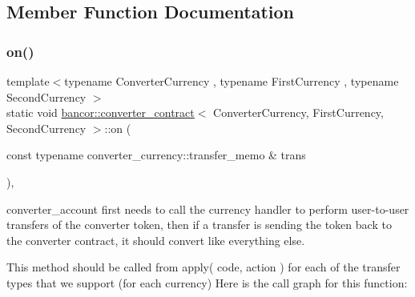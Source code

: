 \subsection{Member Function Documentation}
\mbox{\label{classbancor_1_1converter__contract_a9042eadac31dfc5a4133cfbecaefb66e}} 
\subsubsection{\texorpdfstring{on()}{on()}\hspace{0.1cm}{\footnotesize\ttfamily [1/2]}}
{\footnotesize\ttfamily template$<$typename Converter\+Currency , typename First\+Currency , typename Second\+Currency $>$ \\
static void \mbox{\hyperlink{classbancor_1_1converter__contract}{bancor\+::converter\+\_\+contract}}$<$ Converter\+Currency, First\+Currency, Second\+Currency $>$\+::on (\begin{DoxyParamCaption}\item[{const typename converter\+\_\+currency\+::transfer\+\_\+memo \&}]{trans }\end{DoxyParamCaption})\hspace{0.3cm}{\ttfamily [inline]}, {\ttfamily [static]}}

converter\+\_\+account first needs to call the currency handler to perform user-\/to-\/user transfers of the converter token, then if a transfer is sending the token back to the converter contract, it should convert like everything else.

This method should be called from apply( code, action ) for each of the transfer types that we support (for each currency) Here is the call graph for this function\+:
\mbox{\label{classbancor_1_1converter__contract_a05d78a86731dfec1c38f8997d3392f79}} 
